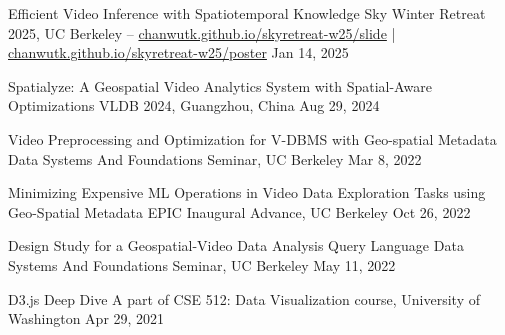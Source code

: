 

\begin{cvpubs}

  \cvpub
    {Efficient Video Inference with Spatiotemporal Knowledge} %
    {Sky Winter Retreat 2025, UC Berkeley -- \href{https://chanwutk.github.io/skyretreat-w25/slide}{chanwutk.github.io/skyretreat-w25/slide}  |  \href{https://chanwutk.github.io/skyretreat-w25/poster}{chanwutk.github.io/skyretreat-w25/poster}} %
    {Jan 14, 2025} %
    {} %

  \cvpub
    {Spatialyze: A Geospatial Video Analytics System with Spatial-Aware Optimizations} %
    {VLDB 2024, Guangzhou, China} %
    {Aug 29, 2024} %
    {} %


  \cvpub
    {Video Preprocessing and Optimization for V-DBMS with Geo-spatial Metadata} %
    {Data Systems And Foundations Seminar, UC Berkeley} %
    {Mar 8, 2022} %
    {} %

  \cvpub
    {Minimizing Expensive ML Operations in Video Data Exploration Tasks using Geo-Spatial Metadata} %
    {EPIC Inaugural Advance, UC Berkeley} %
    {Oct 26, 2022} %
    {} %

  \cvpub
    {Design Study for a Geospatial-Video Data Analysis Query Language} %
    {Data Systems And Foundations Seminar, UC Berkeley} %
    {May 11, 2022} %
    {} %

  \cvpub
    {D3.js Deep Dive} %
    {A part of CSE 512: Data Visualization course, University of Washington} %
    {Apr 29, 2021} %
    {} %
    

\end{cvpubs}
